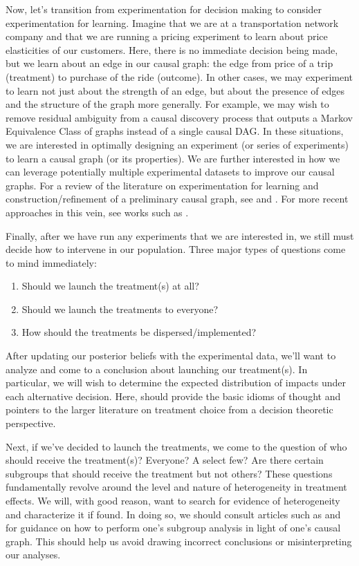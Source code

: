 Now, let's transition from experimentation for decision making to consider experimentation for learning.
Imagine that we are at a transportation network company and that we are running a pricing experiment to learn about price elasticities of our customers.
Here, there is no immediate decision being made, but we learn about an edge in our causal graph: the edge from price of a trip (treatment) to purchase of the ride (outcome).
In other cases, we may experiment to learn not just about the strength of an edge, but about the presence of edges and the structure of the graph more generally.
For example, we may wish to remove residual ambiguity from a causal discovery process that outputs a Markov Equivalence Class of graphs instead of a single causal DAG.
In these situations, we are interested in optimally designing an experiment (or series of experiments) to learn a causal graph (or its properties).
We are further interested in how we can leverage potentially multiple experimental datasets to improve our causal graphs.
For a review of the literature on experimentation for learning and construction/refinement of a preliminary causal graph, see \citet{hyttinen_2013_experiment} and \citet[Sec. 3.1.2]{kalisch_2014_causal}.
For more recent approaches in this vein, see works such as \citet{triantafillou_2015_constraint, kocaoglu_2017_experimental, brouillard_2020_differentiable, rantanen_2020_learning}.

Finally, after we have run any experiments that we are interested in, we still must decide how to intervene in our population.
Three major types of questions come to mind immediately:
\begin{enumerate}
   \item Should we launch the treatment(s) at all?
   \item Should we launch the treatments to everyone?
   \item How should the treatments be dispersed/implemented?
\end{enumerate}

After updating our posterior beliefs with the experimental data, we'll want to analyze and come to a conclusion about launching our treatment(s).
In particular, we will wish to determine the expected distribution of impacts under each alternative decision.
Here, \citet{manski_2019_treatment} should provide the basic idioms of thought and pointers to the larger literature on treatment choice from a decision theoretic perspective.

Next, if we've decided to launch the treatments, we come to the question of who should receive the treatment(s)?
Everyone?
A select few?
Are there certain subgroups that should receive the treatment but not others?
These questions fundamentally revolve around the level and nature of heterogeneity in treatment effects.
We will, with good reason, want to search for evidence of heterogeneity and characterize it if found.
In doing so, we should consult articles such as \citet{pearl_2017_detecting} and \citet{webster_2020_subgroup} for guidance on how to perform one's subgroup analysis in light of one's causal graph.
This should help us avoid drawing incorrect conclusions or misinterpreting our analyses.


